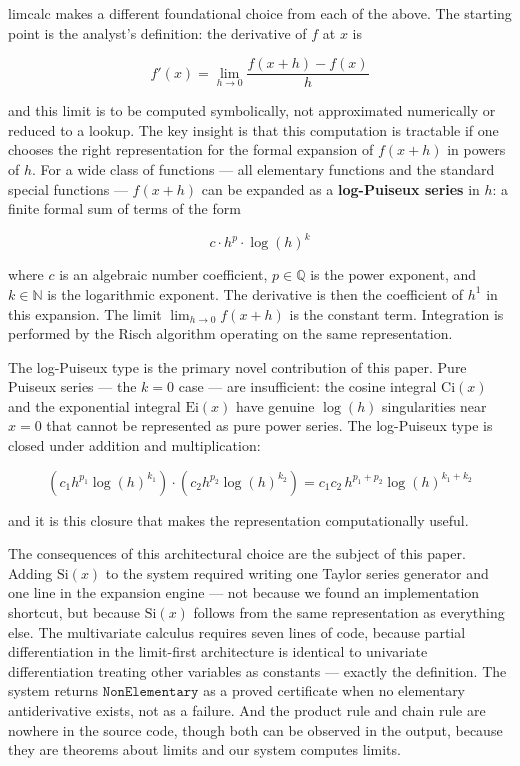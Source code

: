 \documentclass[12pt]{article}
\begin{document}
limcalc makes a different foundational choice from each of the above.
The starting point is the analyst's definition: the derivative of \(f\)
at \(x\) is

\[f'(x) = \lim_{h \to 0} \frac{f(x+h) - f(x)}{h}\]

and this limit is to be computed symbolically, not approximated
numerically or reduced to a lookup. The key insight is that this
computation is tractable if one chooses the right representation for the
formal expansion of \(f(x+h)\) in powers of \(h\). For a wide class of
functions --- all elementary functions and the standard special
functions --- \(f(x+h)\) can be expanded as a \textbf{log-Puiseux
series} in \(h\): a finite formal sum of terms of the form

\[c \cdot h^p \cdot \log(h)^k\]

where \(c\) is an algebraic number coefficient, \(p \in \mathbb{Q}\) is
the power exponent, and \(k \in \mathbb{N}\) is the logarithmic
exponent. The derivative is then the coefficient of \(h^1\) in this
expansion. The limit \(\lim_{h\to 0} f(x+h)\) is the constant term.
Integration is performed by the Risch algorithm operating on the same
representation.

The log-Puiseux type is the primary novel contribution of this paper.
Pure Puiseux series --- the \(k = 0\) case --- are insufficient: the
cosine integral \(\mathrm{Ci}(x)\) and the exponential integral
\(\mathrm{Ei}(x)\) have genuine \(\log(h)\) singularities near \(x = 0\)
that cannot be represented as pure power series. The log-Puiseux type is
closed under addition and multiplication:

\[\left(c_1 h^{p_1} \log(h)^{k_1}\right) \cdot \left(c_2 h^{p_2} \log(h)^{k_2}\right) = c_1 c_2 \, h^{p_1 + p_2} \log(h)^{k_1 + k_2}\]

and it is this closure that makes the representation computationally
useful.

The consequences of this architectural choice are the subject of this
paper. Adding \(\mathrm{Si}(x)\) to the system required writing one
Taylor series generator and one line in the expansion engine --- not
because we found an implementation shortcut, but because
\(\mathrm{Si}(x)\) follows from the same representation as everything
else. The multivariate calculus requires seven lines of code, because
partial differentiation in the limit-first architecture is identical to
univariate differentiation treating other variables as constants ---
exactly the definition. The system returns \(\mathtt{NonElementary}\) as
a proved certificate when no elementary antiderivative exists, not as a
failure. And the product rule and chain rule are nowhere in the source
code, though both can be observed in the output, because they are
theorems about limits and our system computes limits.
\end{document}
